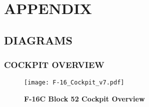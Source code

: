 \appendix
\chapter{APPENDIX}
\minitoc
\cleardoublepage


\section{DIAGRAMS}

\subsection{COCKPIT OVERVIEW}
\begin{figure}[h]
    \centering
    \texttt{[image: F-16\_Cockpit\_v7.pdf]}
    \caption{\textbf{F-16C Block 52 Cockpit Overview}}
    \label{fig:cockpitoverview}
\end{figure}

\cleardoublepage